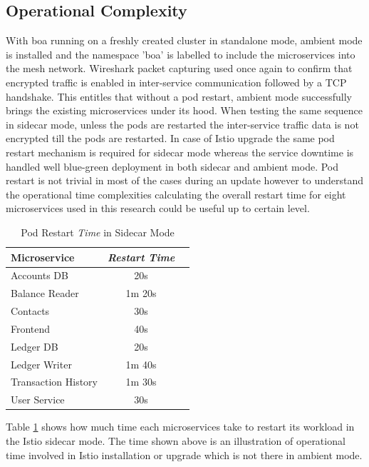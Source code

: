 \subsection{Operational Complexity}
With \acrshort{boa} running on a freshly created cluster in standalone mode, ambient mode is installed and the namespace 'boa' is labelled to include the microservices into the mesh network. Wireshark packet capturing used once again to confirm that encrypted traffic is enabled in inter-service communication followed by a TCP handshake. This entitles that without a pod restart, ambient mode successfully brings the existing microservices under its hood. When testing the same sequence in sidecar mode, unless the pods are restarted the inter-service traffic data is not encrypted till the pods are restarted. In case of Istio upgrade the same pod restart mechanism is required for sidecar mode whereas the service downtime is handled well blue-green deployment in both sidecar and ambient mode. Pod restart is not trivial in most of the cases during an update however to understand the operational time complexities calculating the overall restart time for eight microservices used in this research could be useful up to certain level.

\begin{table}[ht!]
  \centering
  \begin{tabular}{ |l|c|c| }
    \hline
    \textbf{Microservice} & \textbf{\textit{Restart Time}} \\ \hline
    Accounts DB & 20s \\ \hline
    Balance Reader & 1m 20s \\ \hline
    Contacts & 30s \\ \hline
    Frontend & 40s \\ \hline
    Ledger DB & 20s \\ \hline
    Ledger Writer & 1m 40s \\ \hline
    Transaction History & 1m 30s \\ \hline
    User Service & 30s \\ \hline
  \end{tabular}
  \caption{Pod Restart \textit{Time} in Sidecar Mode}
  \label{res:podRestartTime}
\end{table}

Table \ref{res:podRestartTime} shows how much time each microservices take to restart its workload in the Istio sidecar mode. The time shown above is an illustration of operational time involved in Istio installation or upgrade which is not there in ambient mode.